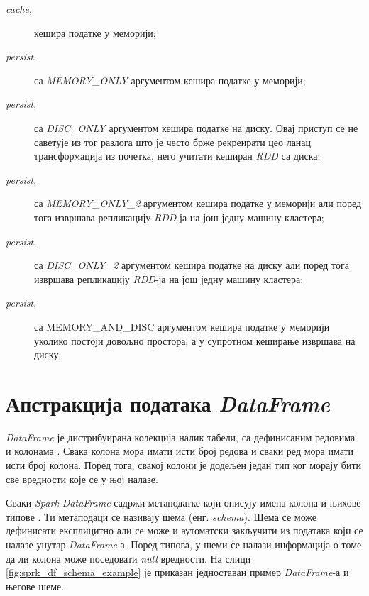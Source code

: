 \documentclass[12pt,oneside]{memoir}
\begin{document}
\begin{description}
	\item[\textit{cache},] кешира податке у меморији;

	\item[\textit{persist},] са \textit{MEMORY\_ONLY} аргументом кешира податке у меморији;

	\item[\textit{persist},] са \textit{DISC\_ONLY} аргументом кешира податке на диску. Овај приступ се не саветује из тог разлога што је често брже рекреирати цео ланац трансформација из почетка, него учитати кеширан \textit{RDD} са диска;

	\item[\textit{persist},] са \textit{MEMORY\_ONLY\_2} аргументом кешира податке у меморији али поред тога извршава репликацију \textit{RDD}-ја на још једну машину кластера;

	\item[\textit{persist},] са \textit{DISC\_ONLY\_2} аргументом кешира податке на диску али поред тога извршава репликацију \textit{RDD}-ја на још једну машину кластера;

	\item[\textit{persist},] са {MEMORY\_AND\_DISC} аргументом кешира податке у меморији уколико постоји довољно простора, а у супротном кеширање извршава на диску.
\end{description}

\section{Апстракција података \textit{DataFrame}}
\label{sec:spark_df}

\textit{DataFrame} је дистрибуирана колекција налик табели, са дефинисаним редовима и колонама \cite{spark_guide}. Свака колона мора имати исти број редова и сваки ред мора имати исти број колона. Поред тога, свакој колони је додељен један тип ког морају бити све вредности које се у њој налазе.

Сваки \textit{Spark DataFrame} садржи метаподатке који описују имена колона и њихове типове  \cite{spark_guide}. Ти метаподаци се називају шема (енг. \textit{schema}). Шема се може дефинисати експлицитно али се може и аутоматски закључити из података који се налазе унутар \textit{DataFrame}-а. Поред типова, у шеми се налази информација о томе да ли колона може поседовати \textit{null} вредности. На слици \ref{fig:sprk_df_schema_example} је приказан једноставан пример \textit{DataFrame}-а и његове шеме.
\end{document}
